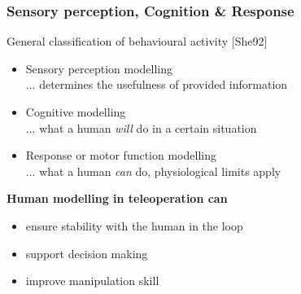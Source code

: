 \documentclass[student]{ITRslides}
\begin{document}
\begin{frame}
	\frametitle{Sensory perception, Cognition \& Response}
	General classification of behavioural activity \nocite{Sheridian1992}{\tiny [She92]}
	\begin{itemize}
	\item Sensory perception modelling \\
	 	... determines the usefulness of provided information
	\item Cognitive modelling \\
		... what a human \emph{will} do in a certain situation
	\item Response or motor function modelling \\
		... what a human \emph{can} do, physiological limits apply
	\end{itemize}
		
	
	

\vspace{6pt}
{\color{tum_blue}\textbf{Human modelling in teleoperation can}}\vspace{-6pt}
\noindent{\color{tum_blue}\rule[0.5ex]{\linewidth}{1.5pt}}
	\begin{itemize}
	\item ensure stability with the human in the loop
	\item support decision making 
	\item improve manipulation skill
	\end{itemize}


\end{frame}

		
\end{document}
